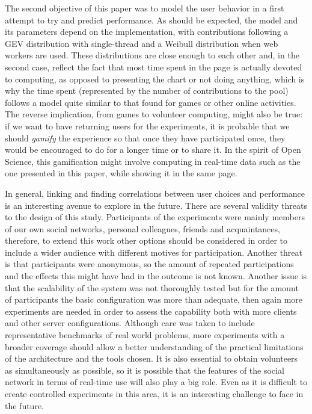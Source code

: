 \documentclass{sig-alternate}
\begin{document}
The second objective of this paper was to model the user behavior in a
first attempt to try and predict performance. As should be expected,
the model and its parameters depend on the implementation, with contributions following
a GEV distribution with single-thread and a
Weibull distribution when web workers are used. These distributions are
close enough to each other and, in the second case, reflect the fact
that most time spent in the page is actually devoted to computing, as
opposed to presenting the chart or not doing anything,
which is why the time spent (represented by the number of
contributions to the pool) follows a model quite similar to that found
for games or other online activities. The reverse implication, from
games to volunteer computing,  might also be true: if we
want to have returning users for the experiments, it is probable that
we should {\em gamify} the experience so that once they have participated
once, they would be encouraged to do for a longer time or to share
it. In the spirit of Open Science, this 
gamification might involve computing in real-time data such as the one
presented in this paper, while showing it in the same page. 

In general, linking and finding correlations between user choices and
performance is an interesting avenue to explore in the future. %
There are several validity threats to the design of this study.
Participants of the experiments were mainly members of our 
own social networks, personal colleagues, friends 
and acquaintances, therefore, to extend this work other options 
should be considered in order to include 
a wider audience with different motives for participation.
Another threat is that participants were anonymous, so the amount of repeated 
participations and the effects this might have had in the outcome is not
known. Another issue is that the scalability of the system was not thoroughly tested
but for the amount of participants the basic configuration 
was more than adequate, then again more experiments are needed in order
to assess the capability both with more clients and other server
configurations. Although care was taken to include representative benchmarks
of real world problems, more experiments with a broader coverage 
should allow a better understanding of the practical limitations of
the architecture and the tools chosen.
It is also essential to obtain volunteers as
simultaneously as possible, so it is possible that the features of the
social network in terms of real-time use will also play a big
role. Even as it is difficult to create controlled experiments in this
area, it is an interesting challenge to face in the future. %
\end{document}
